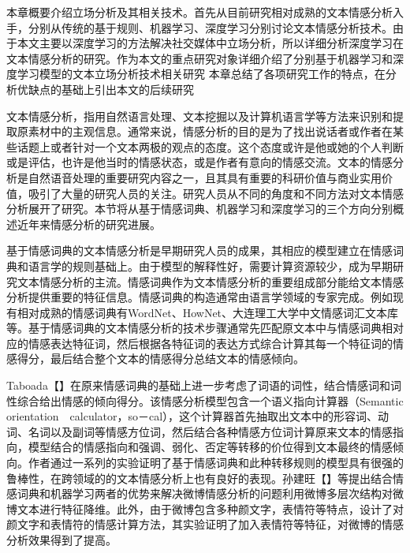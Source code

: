

本章概要介绍立场分析及其相关技术。首先从目前研究相对成熟的文本情感分析入手，分别从传统的基于规则、机器学习、深度学习分别讨论文本情感分析技术。由于本文主要以深度学习的方法解决社交媒体中立场分析，所以详细分析深度学习在文本情感分析的研究。作为本文的重点研究对象详细介绍了分别基于机器学习和深度学习模型的文本立场分析技术相关研究 本章总结了各项研究工作的特点，在分析优缺点的基础上引出本文的后续研究



文本情感分析，指用自然语言处理、文本挖掘以及计算机语言学等方法来识别和提取原素材中的主观信息。通常来说，情感分析的目的是为了找出说话者或作者在某些话题上或者针对一个文本两极的观点的态度。这个态度或许是他或她的个人判断或是评估，也许是他当时的情感状态，或是作者有意向的情感交流。文本的情感分析是自然语音处理的重要研究内容之一，且其具有重要的科研价值与商业实用价值，吸引了大量的研究人员的关注。研究人员从不同的角度和不同方法对文本情感分析展开了研究。本节将从基于情感词典、机器学习和深度学习的三个方向分别概述近年来情感分析的研究进展。


基于情感词典的文本情感分析是早期研究人员的成果，其相应的模型建立在情感词典和语言学的规则基础上。由于模型的解释性好，需要计算资源较少，成为早期研究文本情感分析的主流。情感词典作为文本情感分析的重要组成部分能给文本情感分析提供重要的特征信息。情感词典的构造通常由语言学领域的专家完成。例如现有相对成熟的情感词典有WordNet、HowNet、大连理工大学中文情感词汇文本库等。基于情感词典的文本情感分析的技术步骤通常先匹配原文本中与情感词典相对应的情感表达特征词，然后根据各特征词的表达方式综合计算其每一个特征词的情感得分，最后结合整个文本的情感得分总结文本的情感倾向。

Taboada【】在原来情感词典的基础上进一步考虑了词语的词性，结合情感词和词性综合给出情感的倾向得分。该情感分析模型包含一个语义指向计算器（Semantic　orientation　calculator，so－cal），这个计算器首先抽取出文本中的形容词、动词、名词以及副词等情感方位词，然后结合各种情感方位词计算原来文本的情感指向，模型结合的情感指向和强调、弱化、否定等转移的价位得到文本最终的情感倾向。作者通过一系列的实验证明了基于情感词典和此种转移规则的模型具有很强的鲁棒性，在跨领域的的文本情感分析上也有良好的表现。孙建旺【】等提出结合情感词典和机器学习两者的优势来解决微博情感分析的问题利用微博多层次结构对微博文本进行特征降维。此外，由于微博包含多种颜文字，表情符等特点，设计了对颜文字和表情符的情感计算方法，其实验证明了加入表情符等特征，对微博的情感分析效果得到了提高。

